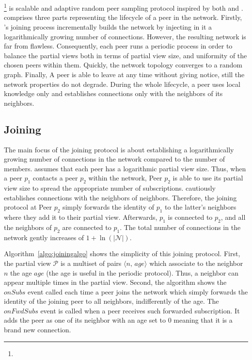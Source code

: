 
\section{\SCAMPLON{}}
\label{sec:proposal}

\SCAMPLON{}\footnote{\SCAMPLONDESCRIPTION{}} is scalable and adaptive random
peer sampling protocol inspired by both \SCAMP{} and \CYCLON{}. \SCAMPLON{}
comprises three parts representing the lifecycle of a peer in the network.
Firstly, \SCAMPLON{}'s joining process incrementally builds the network by
injecting in it a logarithmically growing number of connections. However, the
resulting network is far from flawless. Consequently, each peer runs a periodic
process in order to balance the partial views both in terms of partial view
size, and uniformity of the chosen peers within them. Quickly, the network
topology converges to a random graph. Finally, A peer is able to leave at any
time without giving notice, still the network properties do not degrade. During
the whole lifecycle, a peer uses local knowledge only and establishes
connections only with the neighbors of its neighbors.

\subsection{Joining}

The main focus of the joining protocol is about establishing a logarithmically
growing number of connections in the network compared to the number of members.
\SCAMPLON{} assumes that each peer has a logarithmic partial view size. Thus,
when a peer $p_1$ contacts a peer $p_2$ within the network, Peer $p_2$ is able
to use its partial view size to spread the appropriate number of subscriptions.
\SCAMPLON{} cautiously establishes connections with the neighbors of
neighbors. Therefore, the joining protocol at Peer $p_2$ simply forwards the
identity of $p_1$ to the latter's neighbors where they add it to their partial
view. Afterwards, $p_1$ is connected to $p_2$, and all the neighbors of $p_2$
are connected to $p_1$. The total number of connections in the network gently
increases of $1+\ln(|\mathcal{N}|)$.

Algorithm~\ref{algo:joiningalgo} shows the simplicity of this joining
protocol. First, the partial view $\mathcal{P}$ is a multiset of pairs
$\langle n,\, age\rangle$ which associate to the neighbor $n$ the age $age$
(the age is useful in the periodic protocol). Thus, a neighbor can appear
multiple times in the partial view. Second, the algorithm shows the $onSubs$
event called each time a peer joins the network which simply forwards the
identity of the joining peer to all neighbors, indifferently of the age. The
$onFwdSubs$ event is called when a peer receives such forwarded
subscription. It adds the peer as one of its neighbor with an age set to $0$
meaning that it is a brand new connection.

